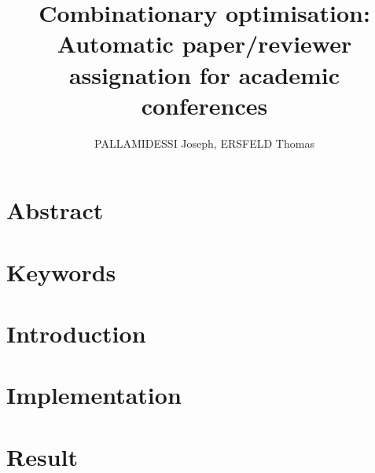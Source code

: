 \documentclass{article}
\begin{document}
  \title{Combinationary optimisation: \\
    \large Automatic paper/reviewer assignation for academic conferences}
  \author{PALLAMIDESSI Joseph, ERSFELD Thomas}
  \maketitle
  
  \section{Abstract} %
  \label{sec:Abstract}
    \paragraph{} %
    \label{par:}
    

  \section{Keywords} %
  \label{sec:Keyword}
    \paragraph{} %
    \label{par:}
    
  
  \section{Introduction} %
  \label{sec:Intr}
    \paragraph{} %
    \label{par:}
    

  \section{Implementation} %
  \label{sec:Implementation}
    \paragraph{} %
    \label{par:}
    

  \section{Result} %
  \label{sec:Result}
    \paragraph{} %
    \label{par:}
    

  
\end{document}

